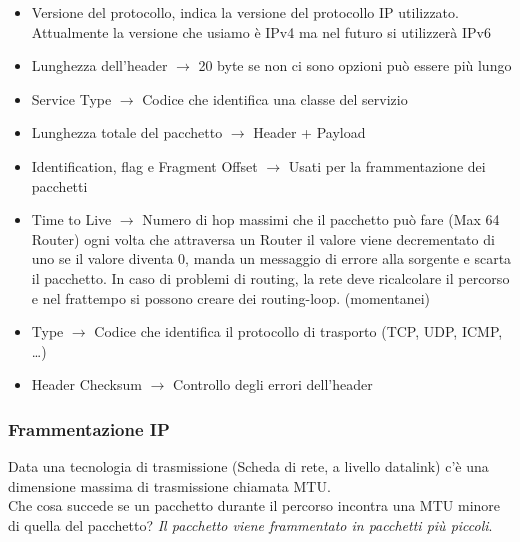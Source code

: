 \documentclass[a4paper]{article}
\begin{document}
\begin{itemize}
  \item Versione del protocollo, indica la versione del protocollo IP utilizzato. Attualmente la versione che usiamo è IPv4 ma nel futuro si utilizzerà IPv6
  \item Lunghezza dell'header $\rightarrow$ 20 byte se non ci sono opzioni può essere più lungo
  \item Service Type $\rightarrow$ Codice che identifica una classe del servizio
  \item Lunghezza totale del pacchetto $\rightarrow$ Header + Payload
  \item Identification, flag e Fragment Offset $\rightarrow$ Usati per la frammentazione dei pacchetti
  \item Time to Live $\rightarrow$ Numero di hop massimi che il pacchetto può fare (Max 64 Router) ogni volta che attraversa un Router il valore viene decrementato di uno
  se il valore diventa 0, manda un messaggio di errore alla sorgente e scarta il pacchetto. In caso di problemi
  di routing, la rete deve ricalcolare il percorso e nel frattempo si possono creare dei routing-loop. (momentanei)
  \item Type $\rightarrow$ Codice che identifica il protocollo di trasporto (TCP, UDP, ICMP, \dots) 
  \item Header Checksum $\rightarrow$ Controllo degli errori dell'header
\end{itemize}

\subsubsection{Frammentazione IP}

Data una tecnologia di trasmissione (Scheda di rete, a livello datalink) c'è una dimensione massima
di trasmissione chiamata MTU. \\
Che cosa succede se un pacchetto durante il percorso incontra una MTU minore di quella del pacchetto?
\textit{Il pacchetto viene frammentato in pacchetti più piccoli}.
\end{document}
